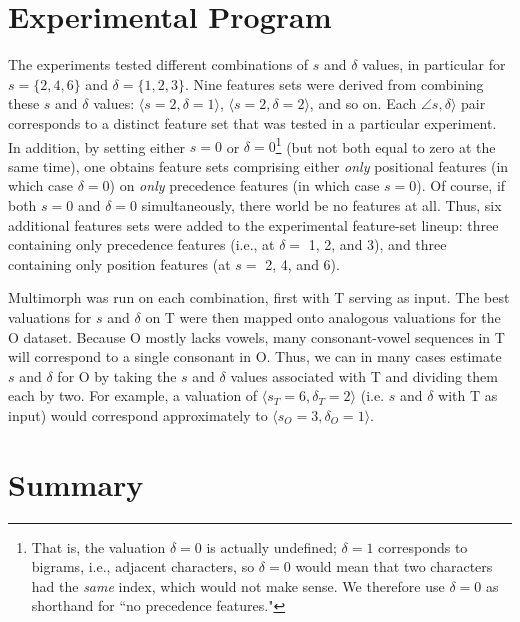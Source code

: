 \section{Experimental Program}
The experiments tested different combinations of $s$ and $\delta$ values, 
in particular for
$s = \{2,4,6\}$ and $\delta = \{1,2,3\}$. Nine features sets were derived from combining these $s$ and $\delta$ values:
$\langle s = 2, \delta =1 \rangle$,  $\langle s = 2, \delta = 2 \rangle$, and so on. %
Each $\angle s, \delta \rangle$ pair corresponds to a distinct feature set that was tested in a particular experiment. 
In addition, by setting either $s = 0$ or $\delta=0$\footnote{That is, the valuation $\delta = 0$ 
is actually undefined; $\delta = 1$ corresponds to bigrams, 
i.e., adjacent characters, so $\delta = 0$ would 
mean that two characters had the \emph{same} index, which 
would not make sense. We therefore use $\delta = 0$ as shorthand 
for ``no precedence features."}
(but not both equal to zero at the same time), one obtains feature sets comprising either \emph{only} positional features (in which case $\delta = 0$) on \emph{only} precedence features (in which case $s = 0$). Of course, if both $s = 0$ and $\delta=0$ simultaneously, there world be no features at all.
Thus, six additional features sets were added to the experimental feature-set lineup: 
three containing only 
precedence features (i.e., at $\delta =$ 1, 2, and 3), and
three containing only position features (at $s =$ 2, 4, and 6).

Multimorph was run on each combination, first with T serving as input.  
The best valuations for $s$ and $\delta$ on T
were then mapped onto analogous valuations for the O 
dataset. Because O mostly lacks vowels, many consonant-vowel 
sequences in T will correspond to a single consonant in 
O. Thus, we can in many cases estimate $s$ and $\delta$ 
for O by taking the $s$ and $\delta$ values associated with T and dividing them each by two. %
For example, a valuation of 
$\langle s_T = 6, \delta_T = 2 \rangle$ 
(i.e. $s$ and $\delta$ with T as input)  would correspond 
approximately to $\langle s_O = 3, \delta_O = 1 \rangle$.

\section{Summary}

